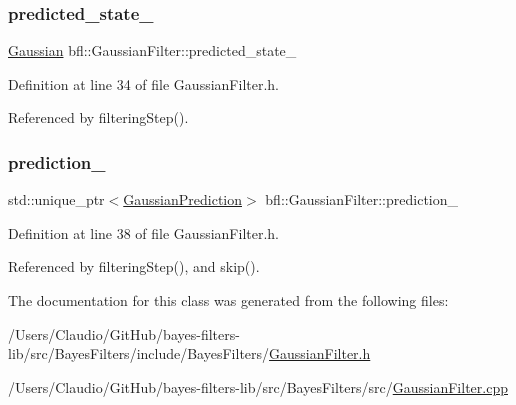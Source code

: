 \subsubsection{\texorpdfstring{predicted\+\_\+state\+\_\+}{predicted\_state\_}}
{\footnotesize\ttfamily \mbox{\hyperlink{classbfl_1_1Gaussian}{Gaussian}} bfl\+::\+Gaussian\+Filter\+::predicted\+\_\+state\+\_\+\hspace{0.3cm}{\ttfamily [protected]}}



Definition at line 34 of file Gaussian\+Filter.\+h.



Referenced by filtering\+Step().

\mbox{\label{classbfl_1_1GaussianFilter_a407bf3e926711e771304a8aaeb4db863}} 
\subsubsection{\texorpdfstring{prediction\+\_\+}{prediction\_}}
{\footnotesize\ttfamily std\+::unique\+\_\+ptr$<$\mbox{\hyperlink{classbfl_1_1GaussianPrediction}{Gaussian\+Prediction}}$>$ bfl\+::\+Gaussian\+Filter\+::prediction\+\_\+\hspace{0.3cm}{\ttfamily [protected]}}



Definition at line 38 of file Gaussian\+Filter.\+h.



Referenced by filtering\+Step(), and skip().



The documentation for this class was generated from the following files\+:\begin{DoxyCompactItemize}
\item 
/\+Users/\+Claudio/\+Git\+Hub/bayes-\/filters-\/lib/src/\+Bayes\+Filters/include/\+Bayes\+Filters/\mbox{\hyperlink{GaussianFilter_8h}{Gaussian\+Filter.\+h}}\item 
/\+Users/\+Claudio/\+Git\+Hub/bayes-\/filters-\/lib/src/\+Bayes\+Filters/src/\mbox{\hyperlink{GaussianFilter_8cpp}{Gaussian\+Filter.\+cpp}}\end{DoxyCompactItemize}
